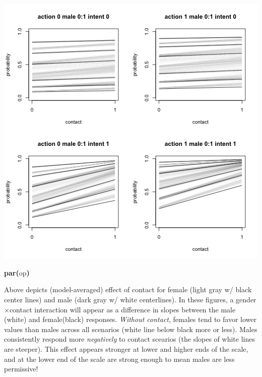 \documentclass{article}
\makeatletter
\newcommand{\hlfunctioncall}[1]{\textcolor[rgb]{.5,0,.33}{\textbf{#1}}}%
\newcommand{\hlkeyword}[1]{\textbf{#1}}%
\newcommand{\hlsymbol}[1]{#1}%
\newcommand{\hlstd}[1]{\textcolor[rgb]{0,0,0}{#1}}%
\newenvironment{kframe}{%
 \def\FrameCommand##1{\hskip\@totalleftmargin \hskip-\fboxsep
 \colorbox{shadecolor}{##1}\hskip-\fboxsep
     \hskip-\linewidth \hskip-\@totalleftmargin \hskip\columnwidth}%
 \MakeFramed {\advance\hsize-\width
   \@totalleftmargin\z@ \linewidth\hsize
   \@setminipage}}%
 {\par\unskip\endMakeFramed}
\newenvironment{knitrout}{}{} %
\makeatother
\begin{document}
\begin{knitrout}
{\begin{kframe}
\begin{flushleft}
\hlstd{}{\ }{\ }{\ }{\ }{\ }{\ }{\ }{\ }\hlkeyword{\usebox{\hlnormalsizeboxclosebrace}}\hspace*{\fill}\\
\hlstd{}{\ }{\ }{\ }{\ }\hlkeyword{\usebox{\hlnormalsizeboxclosebrace}}\hspace*{\fill}\\
\hlstd{}\hlkeyword{\usebox{\hlnormalsizeboxclosebrace}}\mbox{}
\normalfont
\end{flushleft}
\includegraphics{trolley-plots} \begin{flushleft}
\ttfamily\noindent
\hlfunctioncall{par}\hlkeyword{(}\hlsymbol{op}\hlkeyword{)}\mbox{}
\normalfont
\end{flushleft}
\end{kframe}}
\end{knitrout}



Above depicts (model-averaged) effect of contact for female (light gray w/ black center lines) and male (dark gray w/ white centerlines). 
In these figures,  a gender$\times$contact interaction will appear as a difference in slopes between the male (white) and female(black) responses. 
{\em Without contact}, females tend to  favor lower values than males across all scenarios (white line below black more or less).
Males consistently respond more {\em negatively} to contact scearios (the slopes of white lines are steeper). 
This effect appears stronger at lower and higher ends of the scale, and at the lower end of the scale are strong enough to mean males are less permissive! 
\end{document}
